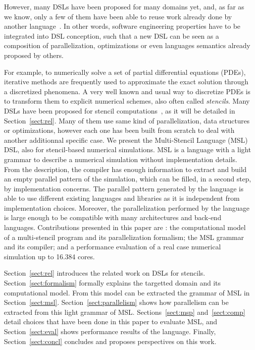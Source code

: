 However, many DSLs have been proposed for many domains yet, and, as far as we know, only a few of them have been able to reuse work already done by another language~\cite{Sujeeth:2013:CRC:2524984.2524988}. In other words, software engineering properties have to be integrated into DSL conception, such that a new DSL can be seen as a composition of parallelization, optimizations or even languages semantics already proposed by others.

For example, to numerically solve a set of partial differential equations (PDEs), iterative methods are frequently used to approximate the exact solution through a discretized phenomena. A very well known and usual way to discretize PDEs is to transform them to explicit numerical schemes, also often called \emph{stencils}. Many DSLs have been proposed for stencil computations~\cite{spaaTangCKLL11,citeulike12258902,Ragan-Kelley:2013:HLC:2491956.2462176,DeVito:2011:LDS:2063384.2063396,Camier:2015:IPP:2820083.2820107}, as it will be detailed in Section~\ref{sect:rel}. Many of them use same kind of parallelization, data structures or optimizations, however each one has been built from scratch to deal with another additionnal specific case.
We present the Multi-Stencil Language (MSL) DSL, also for stencil-based numerical simulations. MSL is a language with a light grammar to describe a numerical simulation without implementation details. From the description, the compiler has enough information to extract and build an empty parallel pattern of the simulation, which can be filled, in a second step, by implementation concerns. The parallel pattern generated by the language is able to use different existing languages and libraries as it is independent from implementation choices. Moreover, the parallelization performed by the language is large enough to be compatible with many architectures and back-end languages. Contributions presented in this paper are : the computational model of a multi-stencil program and its parallelization formalism; the MSL grammar and its compiler; and a performance evaluation of a real case numerical simulation up to 16.384 cores.

Section~\ref{sect:rel} introduces the related work on DSLs for stencils. Section~\ref{sect:formalism} formally explains the targetted domain and its computational model. From this model can be extracted the grammar of MSL in Section~\ref{sect:msl}. Section~\ref{sect:parallelism} shows how parallelism can be extracted from this light grammar of MSL. Sections~\ref{sect:msp} and~\ref{sect:comp} detail choices that have been done in this paper to evaluate MSL, and Section~\ref{sect:eval} shows performance results of the language. Finally, Section~\ref{sect:concl} concludes and proposes perspectives on this work.